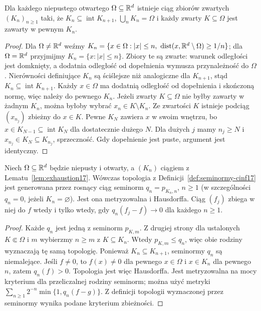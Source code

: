 \begin{lemat}
\label{lem:exhaustion17}
Dla każdego niepustego otwartego $\Omega\subseteq\mathbb R^d$ istnieje
ciąg zbiorów zwartych $(K_n)_{n\ge1}$ taki, że
$K_n\subseteq\operatorname{int}K_{n+1}$, $\bigcup_nK_n=\Omega$
i każdy zwarty $K\subseteq\Omega$ jest zawarty w pewnym $K_n$.
\end{lemat}
\begin{proof}
Dla $\Omega\ne\mathbb R^d$ weźmy
$K_n=\{x\in\Omega:|x|\le n,\
\operatorname{dist}(x,\mathbb R^d\setminus\Omega)\ge1/n\}$;
dla $\Omega=\mathbb R^d$ przyjmijmy $K_n=\{x:|x|\le n\}$.
Zbiory te są zwarte: warunek odległości jest domknięty,
a dodatnia odległość od dopełnienia wymusza przynależność do $\Omega$.
Nierówności definiujące $K_n$ są ściślejsze niż analogiczne dla
$K_{n+1}$, stąd $K_n\subseteq\operatorname{int}K_{n+1}$.
Każdy $x\in\Omega$ ma dodatnią odległość od dopełnienia
i skończoną normę, więc należy do pewnego $K_n$.
Jeżeli zwarty $K\subseteq\Omega$ nie byłby zawarty w żadnym $K_n$,
można byłoby wybrać $x_n\in K\setminus K_n$.
Ze zwartości $K$ istnieje podciąg $(x_{n_j})$ zbieżny
do $x\in K$. Pewne $K_N$ zawiera $x$ w swoim wnętrzu,
bo $x\in K_{N-1}\subseteq\operatorname{int}K_N$
dla dostatecznie dużego $N$.
Dla dużych $j$ mamy $n_j\ge N$ i $x_{n_j}\in K_N\subseteq K_{n_j}$,
sprzeczność. Gdy dopełnienie jest puste, argument jest identyczny.
\end{proof}

\begin{twierdzenie}
\label{thm:countable-cinf17}
Niech $\Omega\subseteq\mathbb R^d$ będzie niepusty i otwarty,
a $(K_n)$ ciągiem z Lematu~\ref{lem:exhaustion17}.
Wówczas topologia z Definicji~\ref{def:seminormy-cinf17}
jest generowana przez rosnący ciąg seminorm
$q_n=p_{K_n,n}$, $n\ge1$ (w szczególności $q_n=0$,
jeżeli $K_n=\varnothing$). Jest ona metryzowalna i Hausdorffa.
Ciąg $(f_j)$ zbiega w niej do $f$ wtedy i tylko wtedy, gdy
$q_n(f_j-f)\to0$ dla każdego $n\ge1$.
\end{twierdzenie}
\begin{proof}
Każde $q_n$ jest jedną z seminorm $p_{K,m}$.
Z drugiej strony dla ustalonych $K\Subset\Omega$ i $m$
wybierzmy $n\ge m$ z $K\subseteq K_n$.
Wtedy $p_{K,m}\le q_n$, więc obie rodziny wyznaczają tę samą
topologię. Ponieważ $K_n\subseteq K_{n+1}$, seminormy $q_n$
są niemalejące. Jeśli $f\ne0$, to $f(x)\ne0$ dla pewnego
$x\in\Omega$ i $x\in K_n$ dla pewnego $n$, zatem $q_n(f)>0$.
Topologia jest więc Hausdorffa. Jest metryzowalna na mocy
kryterium dla przeliczalnej rodziny seminorm; można użyć metryki
$\sum_{n\ge1}2^{-n}\min\{1,q_n(f-g)\}$.
Z definicji topologii wyznaczonej przez seminormy wynika
podane kryterium zbieżności.
\end{proof}

